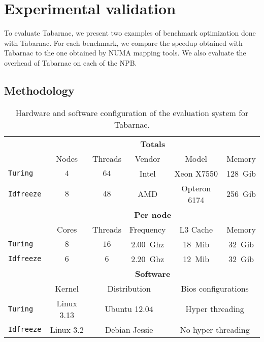 \section{Experimental validation}
\label{sec:tab-expe}

To evaluate \gls{Tabarnac}, we present two examples of benchmark optimization done with \gls{Tabarnac}.
For each benchmark, we compare the speedup obtained with \gls{Tabarnac} to the one obtained by \gls{NUMA} mapping tools.
We also evaluate the overhead of \gls{Tabarnac} on each of the \gls{NPB}.

\subsection{Methodology}


\begin{table}[htb]
    \centering
    \begin{tabular}{lccccc}
        \toprule
        & \multicolumn{5}{c}{\textbf{Totals}}\\
        \cmidrule(lr){2-6}
        & Nodes & Threads & Vendor & Model & Memory \\
        \cmidrule(lr){2-6}
        \texttt{Turing}   & $4$ & $64$ & Intel & Xeon X7550   & \SI{128}{Gib} \\
        \texttt{Idfreeze} & $8$ & $48$ & AMD   & Opteron 6174 & \SI{256}{Gib}\\
        \midrule
        & \multicolumn{5}{c}{\textbf{Per node}}\\
        \cmidrule(lr){2-6}
        & Cores & Threads & Frequency & L3 Cache & Memory \\
        \cmidrule(lr){2-6}
        \texttt{Turing}   & $8$ & $16$ & \SI{2.00}{Ghz}& \SI{18}{Mib} & \SI{32}{Gib} \\
        \texttt{Idfreeze} & $6$ & $6$  & \SI{2.20}{Ghz}& \SI{12}{Mib} & \SI{32}{Gib}\\
        \midrule
        & \multicolumn{5}{c}{\textbf{Software}}\\
        \cmidrule(lr){2-6}
        & Kernel & \multicolumn{2}{c}{Distribution} &
            \multicolumn{2}{c}{Bios configurations} \\
        \cmidrule(lr){2-6}
        \texttt{Turing}   & Linux 3.13 & \multicolumn{2}{c}{Ubuntu 12.04} &
            \multicolumn{2}{c}{Hyper threading} \\
        \texttt{Idfreeze} & Linux 3.2 & \multicolumn{2}{c}{Debian Jessie} &
            \multicolumn{2}{c}{No hyper threading}\\
        \bottomrule
    \end{tabular}
    \caption{Hardware and software configuration of the evaluation system for Tabarnac.}
    \label{tab:turing-hw}
\end{table}

